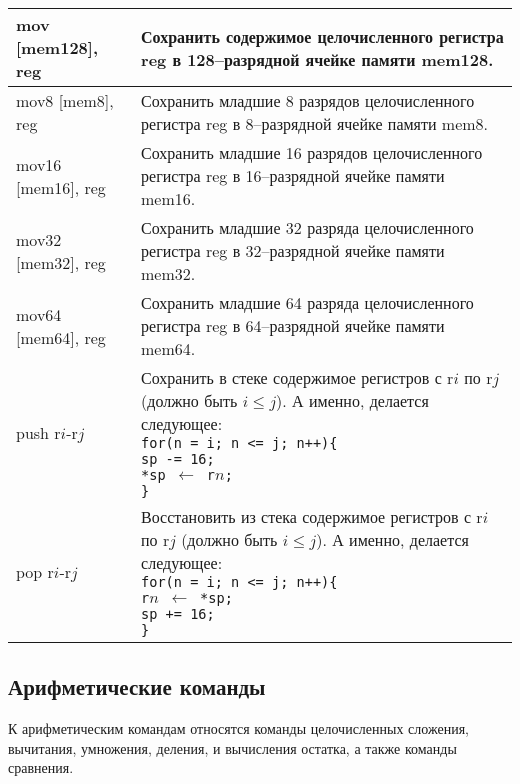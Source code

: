 \documentclass[10pt]{report}
\begin{document}
\begin{longtable}[c]{|l|p{12.5cm}|}
mov [mem128], reg     & Сохранить содержимое целочисленного регистра reg в 128--разрядной ячейке памяти mem128.\\ \hline
mov8 [mem8], reg      & Сохранить младшие 8 разрядов целочисленного регистра reg в 8--разрядной ячейке памяти mem8.\\ \hline
mov16 [mem16], reg    & Сохранить младшие 16 разрядов целочисленного регистра reg в 16--разрядной ячейке памяти mem16.\\ \hline
mov32 [mem32], reg    & Сохранить младшие 32 разряда целочисленного регистра reg в 32--разрядной ячейке памяти mem32.\\ \hline
mov64 [mem64], reg    & Сохранить младшие 64 разряда целочисленного регистра reg в 64--разрядной ячейке памяти mem64.\\ \hline
push r$i$-r$j$        & {\parbox{12.3cm}{Сохранить в стеке содержимое регистров с  r$i$ по r$j$ (должно быть $i\leqslant j$). А именно, делается следующее:\\
\texttt{for(n = i; n <= j; n++)\{\\
\phantom{aaaa}sp -= 16;\\
\phantom{aaaa}*sp $\leftarrow$ r$n$;\\
\} }
}}  \\ \hline
pop r$i$-r$j$        & {\parbox{12.3cm}{Восстановить из стека содержимое регистров с  r$i$ по r$j$ (должно быть $i\leqslant j$). А именно, делается следующее:\\
\texttt{for(n = i; n <= j; n++)\{\\
\phantom{aaaa}r$n$ $\leftarrow$ *sp;\\
\phantom{aaaa}sp += 16;\\
\} }
}}  \\ \hline
\end{longtable}    

     
        \subsection{Арифметические команды}
К арифметическим командам относятся команды целочисленных сложения, вычитания, умножения, деления, и вычисления остатка, а также команды сравнения.
\end{document}

